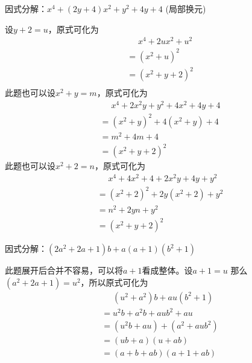 \documentclass[windows,csize4,answers]{BHCexam}
\begin{document}
\begin{groups}
\begin{questions}[]
        \question[5]因式分解：$x^4+(2y+4)x^2+y^2+4y+4$ (局部换元)
        \begin{solution}{0.5cm}
            \method 设$y+2=u$，原式可化为
            \[
                \begin{aligned}
                     & \phantom{=}x^4+2ux^2+u^2 \\
                     & =(x^2+u)^2               \\
                     & =(x^2+y+2)^2             \\
                \end{aligned}
            \]
            \method 此题也可以设$x^2+y=m$，原式可化为
            \[
                \begin{aligned}
                     & \phantom{=}x^4+2x^2 y+y^2+4x^2+4y+4 \\
                     & =(x^2+y)^2 + 4(x^2+y) +4            \\
                     & =m^2+4m+4                           \\
                     & =(x^2+y+2)^2
                \end{aligned}
            \]
            \method 此题也可以设$x^2+2=n$，原式可化为
            \[
                \begin{aligned}
                     & \phantom{=}x^4+4x^2+4+2x^2 y+4y+y^2 \\
                     & =(x^2+2)^2+2y(x^2+2)+y^2            \\
                     & =n^2+2yn+y^2                        \\
                     & =(x^2+y+2)^2
                \end{aligned}
            \]
        \end{solution}
        \vspace{3.5cm}

        \question[5] 因式分解：$(2a^2+2a+1)b+a(a+1)(b^2+1)$
        \begin{solution}{0.5cm}
            \methodonly 此题展开后合并不容易，可以将$a+1$看成整体。设$a+1=u$
            那么$(a^2+2a+1)=u^2$，所以原式可化为
            \[
                \begin{aligned}
                     & \phantom{=}(u^2+a^2)b+au(b^2+1) \\
                     & =u^2b+a^2b+aub^2+au             \\
                     & =(u^2b+au)+(a^2+aub^2)          \\
                     & =(ub+a)(u+ab)                   \\
                     & =(a+b+ab)(a+1+ab)
                \end{aligned}
            \]
        \end{solution}


\end{questions}
\end{groups}
\end{document}
